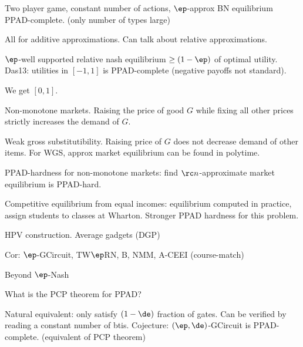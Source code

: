 Two player game, constant number of actions, $\ep$-approx BN equilibrium PPAD-complete. (only number of types large)

All for additive approximations. Can talk about relative approximations. 

$\ep$-well supported relative nash equilibrium $\ge (1-\ep)$ of optimal utility. Das13: utilities in $[-1,1]$ is PPAD-complete (negative payoffs not standard). 

We get $[0,1]$.

Non-monotone markets. %
Raising the price of good $G$ while fixing all other prices strictly increases the demand of $G$.

Weak gross substitutibility.
Raising price of $G$ does not decrease demand of other items. 
For WGS, approx market equilibrium can be found in polytime.

PPAD-hardness for non-monotone markets: find $\rc n$-approximate market equilibrium is PPAD-hard. 

Competitive equilibrium from equal incomes: equilibrium computed in practice, assign students to classes at Wharton. Stronger PPAD hardness for this problem. 

HPV construction. Average gadgets (DGP)

Cor: $\ep$-GCircuit, TW$\ep$RN, B, NMM, A-CEEI (course-match)

Beyond $\ep$-Nash

What is the PCP theorem for PPAD?

Natural equivalent: only satisfy $(1-\de)$ fraction of gates. Can be verified by reading a constant number of btis. Cojecture: $(\ep,\de)$-GCircuit is PPAD-complete. (equivalent of PCP theorem)

